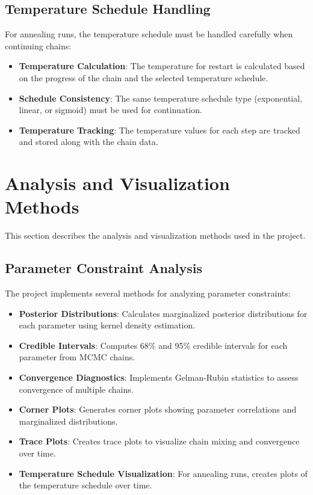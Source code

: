 \documentclass[11pt]{article}
\begin{document}
\subsection{Temperature Schedule Handling}

For annealing runs, the temperature schedule must be handled carefully when continuing chains:

\begin{itemize}
    \item \textbf{Temperature Calculation}: The temperature for restart is calculated based on the progress of the chain and the selected temperature schedule.
    \item \textbf{Schedule Consistency}: The same temperature schedule type (exponential, linear, or sigmoid) must be used for continuation.
    \item \textbf{Temperature Tracking}: The temperature values for each step are tracked and stored along with the chain data.
\end{itemize}

\section{Analysis and Visualization Methods}

This section describes the analysis and visualization methods used in the project.

\subsection{Parameter Constraint Analysis}

The project implements several methods for analyzing parameter constraints:

\begin{itemize}
    \item \textbf{Posterior Distributions}: Calculates marginalized posterior distributions for each parameter using kernel density estimation.
    
    \item \textbf{Credible Intervals}: Computes 68\% and 95\% credible intervals for each parameter from MCMC chains.
    
    \item \textbf{Convergence Diagnostics}: Implements Gelman-Rubin statistics to assess convergence of multiple chains.
    
    \item \textbf{Corner Plots}: Generates corner plots showing parameter correlations and marginalized distributions.
    
    \item \textbf{Trace Plots}: Creates trace plots to visualize chain mixing and convergence over time.
    
    \item \textbf{Temperature Schedule Visualization}: For annealing runs, creates plots of the temperature schedule over time.
\end{itemize}
\end{document}
